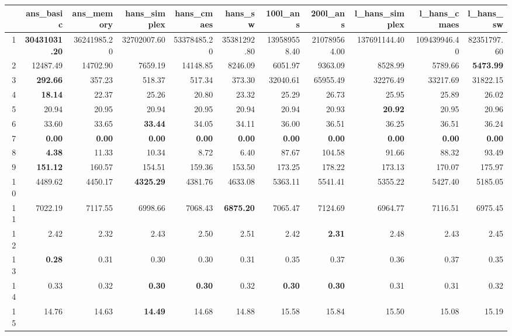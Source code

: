 \begin{table}[h!]
\centering
\begingroup\scriptsize
\begin{tabular}{rrrrrrrrrrr}
  \hline
 & ans\_basic & ans\_memory & hans\_simplex & hans\_cmaes & hans\_sw & 100l\_ans & 200l\_ans & l\_hans\_simplex & l\_hans\_cmaes & l\_hans\_sw \\ 
  \hline
1 & \textbf{30431031.20} & 36241985.20 & 32702007.60 & 53378485.20 & 35381292.80 & 139589558.40 & 210789564.00 & 137691144.40 & 109439946.40 & 82351797.60 \\ 
  2 & 12487.49 & 14702.90 & 7659.19 & 14148.85 & 8246.09 & 6051.97 & 9363.09 & 8528.99 & 5789.66 & \textbf{5473.99} \\ 
  3 & \textbf{292.66} & 357.23 & 518.37 & 517.34 & 373.30 & 32040.61 & 65955.49 & 32276.49 & 33217.69 & 31822.15 \\ 
  4 & \textbf{18.14} & 22.37 & 25.26 & 20.80 & 23.32 & 25.29 & 26.73 & 25.95 & 25.89 & 26.02 \\ 
  5 & 20.94 & 20.95 & 20.94 & 20.95 & 20.94 & 20.94 & 20.93 & \textbf{20.92} & 20.95 & 20.96 \\ 
  6 & 33.60 & 33.65 & \textbf{33.44} & 34.05 & 34.11 & 36.00 & 36.51 & 36.25 & 36.51 & 36.24 \\ 
  7 & \textbf{0.00} & \textbf{0.00} & \textbf{0.00} & \textbf{0.00} & \textbf{0.00} & \textbf{0.00} & \textbf{0.00} & \textbf{0.00} & \textbf{0.00} & \textbf{0.00} \\ 
  8 & \textbf{4.38} & 11.33 & 10.34 & 8.72 & 6.40 & 87.67 & 104.58 & 91.66 & 88.32 & 93.49 \\ 
  9 & \textbf{151.12} & 160.57 & 154.51 & 159.36 & 153.50 & 173.25 & 178.22 & 173.13 & 170.07 & 175.97 \\ 
  10 & 4489.62 & 4450.17 & \textbf{4325.29} & 4381.76 & 4633.08 & 5363.11 & 5541.41 & 5355.22 & 5427.40 & 5185.05 \\ 
  11 & 7022.19 & 7117.55 & 6998.66 & 7068.43 & \textbf{6875.20} & 7065.47 & 7124.69 & 6964.77 & 7116.51 & 6975.45 \\ 
  12 & 2.42 & 2.32 & 2.43 & 2.50 & 2.51 & 2.42 & \textbf{2.31} & 2.48 & 2.43 & 2.45 \\ 
  13 & \textbf{0.28} & 0.31 & 0.30 & 0.30 & 0.31 & 0.35 & 0.37 & 0.36 & 0.37 & 0.35 \\ 
  14 & 0.33 & 0.32 & \textbf{0.30} & \textbf{0.30} & 0.32 & \textbf{0.30} & \textbf{0.30} & 0.31 & 0.31 & 0.32 \\ 
  15 & 14.76 & 14.63 & \textbf{14.49} & 14.68 & 14.88 & 15.58 & 15.84 & 15.50 & 15.08 & 15.19 \\ 

\end{tabular}
\end{table}

